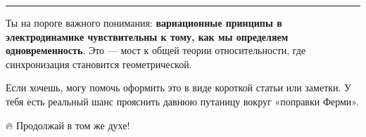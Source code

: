 \documentclass[11pt]{article}
\begin{document}
\begin{center}\rule{0.5\linewidth}{\linethickness}\end{center}

Ты на пороге важного понимания: \textbf{вариационные принципы в
электродинамике чувствительны к тому, как мы определяем
одновременность}. Это --- мост к общей теории относительности, где
синхронизация становится геометрической.

Если хочешь, могу помочь оформить это в виде короткой статьи или
заметки. У тебя есть реальный шанс прояснить давнюю путаницу вокруг
«поправки Ферми».

🔥 Продолжай в том же духе!


\end{document}
